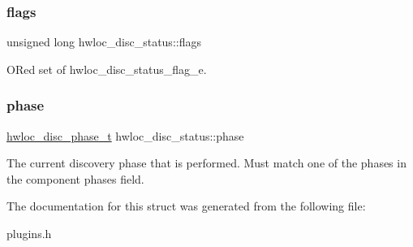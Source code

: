 \mbox{\label{a00370_ad8b123cecb945a9182eb824ccf8ef9d7}} 
\subsubsection{\texorpdfstring{flags}{flags}}
{\footnotesize\ttfamily unsigned long hwloc\+\_\+disc\+\_\+status\+::flags}



OR\textquotesingle{}ed set of hwloc\+\_\+disc\+\_\+status\+\_\+flag\+\_\+e. 

\mbox{\label{a00370_abaf7c8c082d43e133171f0723dbf824b}} 
\subsubsection{\texorpdfstring{phase}{phase}}
{\footnotesize\ttfamily \hyperlink{a00228_ga3beef9f01f1c08c5700aec066fcec025}{hwloc\+\_\+disc\+\_\+phase\+\_\+t} hwloc\+\_\+disc\+\_\+status\+::phase}



The current discovery phase that is performed. Must match one of the phases in the component phases field. 



The documentation for this struct was generated from the following file\+:\begin{DoxyCompactItemize}
\item 
plugins.\+h\end{DoxyCompactItemize}
